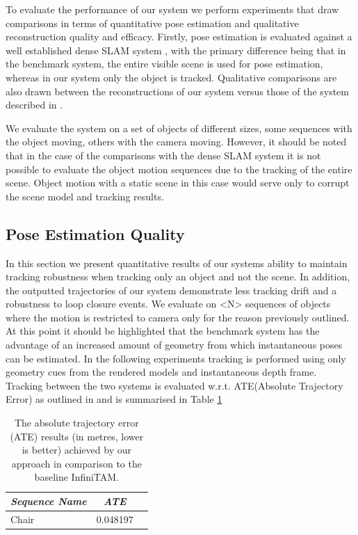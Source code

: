 To evaluate the performance of our system we perform experiments that draw comparisons in terms of quantitative pose estimation and qualitative reconstruction quality and efficacy.
Firstly, pose estimation is evaluated against a well established dense SLAM system \cite{Prisacariu2014}, with the primary difference being that in the benchmark system, the entire 
visible scene is used for pose estimation, whereas in our system only the object is tracked.
Qualitative comparisons are also drawn between the reconstructions of our system versus those of the system described in \cite{Ren2013}.

We evaluate the system on a set of objects of different sizes, some sequences with the object moving, others with the camera moving. However, it should be noted that in the case of the 
comparisons with the dense SLAM system it is not possible to evaluate the object motion sequences due to the tracking of the entire scene. Object motion with a static scene in this case 
would serve only to corrupt the scene model and tracking results.

\subsection{Pose Estimation Quality}
In this section we present quantitative results of our systems ability to maintain tracking robustness when tracking only an object and not the scene. In addition, the outputted trajectories 
of our system demonstrate less tracking drift and a robustness to loop closure events. We evaluate on <N> sequences of objects where the motion is restricted to camera only for the reason 
previously outlined. At this point it should be highlighted that the benchmark system has the advantage of an increased amount of geometry from which instantaneous poses can be estimated.
In the following experiments tracking is performed using only geometry cues from the rendered models and instantaneous depth frame.\\

Tracking between the two systems is evaluated w.r.t. ATE(Absolute Trajectory Error) as outlined in \cite{sturm12iros} and is summarised in Table \ref{ateTable}
\begin{table}[!t]
	{\small
		\begin{center}
			\begin{tabular}{l@{\hskip 1cm} c c}
				\emph{Sequence Name} & \emph{ATE}\\
				\midrule
				\textsf{Chair} & 0.048197\\
			\end{tabular}
		\end{center}
	}
	\caption{The absolute trajectory error (ATE) results (in metres, lower is better) achieved by our approach in comparison to the baseline InfiniTAM.}
	\label{ateTable}
\end{table}

